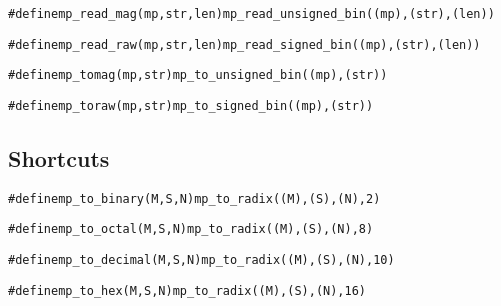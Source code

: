 \documentclass[synpaper]{book}
\begin{document}
\begin{alltt}
#define mp_read_mag(mp, str, len) mp_read_unsigned_bin((mp), (str), (len))
\end{alltt}


\begin{alltt}
 #define mp_read_raw(mp, str, len) mp_read_signed_bin((mp), (str), (len))
\end{alltt}


\begin{alltt}
#define mp_tomag(mp, str) mp_to_unsigned_bin((mp), (str))
\end{alltt}


\begin{alltt}
#define mp_toraw(mp, str)         mp_to_signed_bin((mp), (str))
\end{alltt}



\subsection{Shortcuts}

\begin{alltt}
#define mp_to_binary(M, S, N)  mp_to_radix((M), (S), (N), 2)
\end{alltt}


\begin{alltt}
#define mp_to_octal(M, S, N)   mp_to_radix((M), (S), (N), 8)
\end{alltt}


\begin{alltt}
#define mp_to_decimal(M, S, N) mp_to_radix((M), (S), (N), 10)
\end{alltt}


\begin{alltt}
#define mp_to_hex(M, S, N)     mp_to_radix((M), (S), (N), 16)
\end{alltt}
\end{document}
